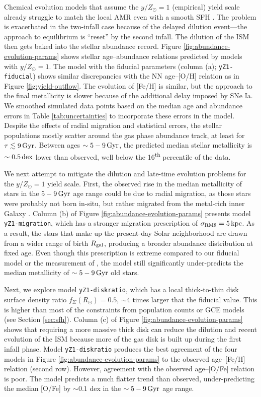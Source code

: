 \documentclass[twocolumn,twocolappendix]{aastex701}
\newcommand{\yZ}[1]{$y/Z_\odot=#1$}
\newcommand{\kpc}{\,{\rm kpc}}
\newcommand{\Gyr}{\,{\rm Gyr}}
\newcommand{\dex}{\,{\rm dex}}
\begin{document}
Chemical evolution models that assume the \yZ{1} (empirical) yield scale already struggle to match the local AMR even with a smooth SFH \citep[see also][]{johnson_milky_2025}. The problem is exacerbated in the two-infall case because of the delayed dilution event---the approach to equilibrium is ``reset'' by the second infall. The dilution of the ISM then gets baked into the stellar abundance record.
Figure \ref{fig:abundance-evolution-params} shows stellar age--abundance relations predicted by models with \yZ{1}. The model with the fiducial parameters (column (a); {\tt yZ1-fiducial}) shows similar discrepancies with the \citet{leung_variational_2023} NN age--[O/H] relation as in Figure \ref{fig:yield-outflow}. The evolution of [Fe/H] is similar, but the approach to the final metallicity is slower because of the additional delay imposed by SNe Ia. We smoothed simulated data points based on the median age and abundance errors in Table \ref{tab:uncertainties} to incorporate these errors in the model. Despite the effects of radial migration and statistical errors, the stellar populations mostly scatter around the gas phase abundance track, at least for $\tau\lesssim9\Gyr$. Between ages $\sim5-9\Gyr$, the predicted median stellar metallicity is $\sim0.5\dex$ lower than observed, well below the 16\textsuperscript{th} percentile of the data.

We next attempt to mitigate the dilution and late-time evolution problems for the \yZ{1} yield scale. First, the observed rise in the median metallicity of stars in the $5-9\Gyr$ age range could be due to radial migration, as those stars were probably not born in-situ, but rather migrated from the metal-rich inner Galaxy \citep{feuillet_age-resolved_2018}. Column (b) of Figure \ref{fig:abundance-evolution-params} presents model {\tt yZ1-migration}, which has a stronger migration prescription of $\sigma_{\rm RM8}=5\kpc$. As a result, the stars that make up the present-day Solar neighborhood are drawn from a wider range of birth $R_{\rm gal}$, producing a broader abundance distribution at fixed age. Even though this prescription is extreme compared to our fiducial model or the measurement of \citet{frankel_measuring_2018}, the model still significantly under-predicts the median metallicity of $\sim5-9\,{\rm Gyr}$ old stars.

Next, we explore model {\tt yZ1-diskratio}, which has a local thick-to-thin disk surface density ratio $f_\Sigma(R_\odot)=0.5$, $\sim4$ times larger that the fiducial value. This is higher than most of the constraints from population counts or GCE models (see Section \ref{sec:sfh}). Column (c) of Figure \ref{fig:abundance-evolution-params} shows that requiring a more massive thick disk can reduce the dilution and recent evolution of the ISM because more of the gas disk is built up during the first infall phase. Model {\tt yZ1-diskratio} produces the best agreement of the four models in Figure \ref{fig:abundance-evolution-params} to the observed age--[Fe/H] relation (second row). However, agreement with the observed age--[O/Fe] relation is poor. The model predicts a much flatter trend than observed, under-predicting the median [O/Fe] by $\sim0.1$ dex in the $\sim5-9\Gyr$ age range.
\end{document}
